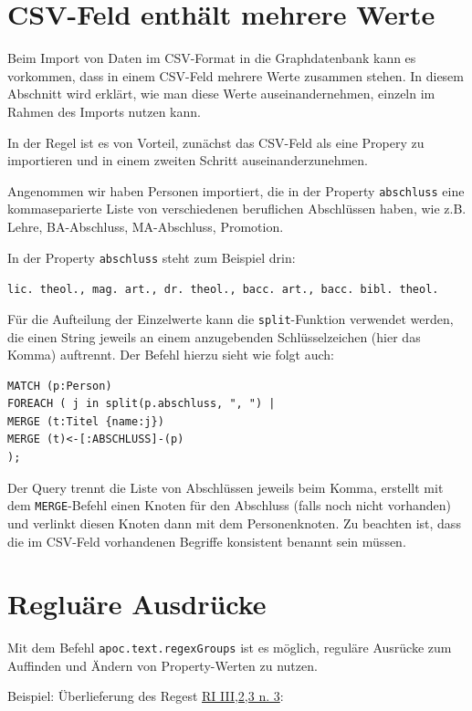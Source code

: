 \documentclass[ngerman,]{scrreprt}
\begin{document}
\section{CSV-Feld enthält mehrere Werte}\label{csv-feld-enthuxe4lt-mehrere-werte}

Beim Import von Daten im CSV-Format in die Graphdatenbank kann es vorkommen, dass in einem CSV-Feld mehrere Werte zusammen stehen. In diesem Abschnitt wird erklärt, wie man diese Werte auseinandernehmen, einzeln im Rahmen des Imports nutzen kann.

In der Regel ist es von Vorteil, zunächst das CSV-Feld als eine Propery zu importieren und in einem zweiten Schritt auseinanderzunehmen.

Angenommen wir haben Personen importiert, die in der Property \texttt{abschluss} eine kommaseparierte Liste von verschiedenen beruflichen Abschlüssen haben, wie z.B. Lehre, BA-Abschluss, MA-Abschluss, Promotion.

In der Property \texttt{abschluss} steht zum Beispiel drin:

\texttt{lic.\ theol.,\ mag.\ art.,\ dr.\ theol.,\ bacc.\ art.,\ bacc.\ bibl.\ theol.}

Für die Aufteilung der Einzelwerte kann die \texttt{split}-Funktion verwendet werden, die einen String jeweils an einem anzugebenden Schlüsselzeichen (hier das Komma) auftrennt. Der Befehl hierzu sieht wie folgt auch:

\begin{verbatim}
MATCH (p:Person)
FOREACH ( j in split(p.abschluss, ", ") |
MERGE (t:Titel {name:j})
MERGE (t)<-[:ABSCHLUSS]-(p)
);
\end{verbatim}

Der Query trennt die Liste von Abschlüssen jeweils beim Komma, erstellt mit dem \texttt{MERGE}-Befehl einen Knoten für den Abschluss (falls noch nicht vorhanden) und verlinkt diesen Knoten dann mit dem Personenknoten. Zu beachten ist, dass die im CSV-Feld vorhandenen Begriffe konsistent benannt sein müssen.

\section{Regluäre Ausdrücke}\label{regluuxe4re-ausdruxfccke}

Mit dem Befehl \texttt{apoc.text.regexGroups} ist es möglich, reguläre Ausrücke zum Auffinden und Ändern von Property-Werten zu nutzen.

Beispiel: Überlieferung des Regest \href{http://www.regesta-imperii.de/id/1051-02-02_1_0_3_2_3_3_3}{RI III,2,3 n. 3}:
\end{document}
